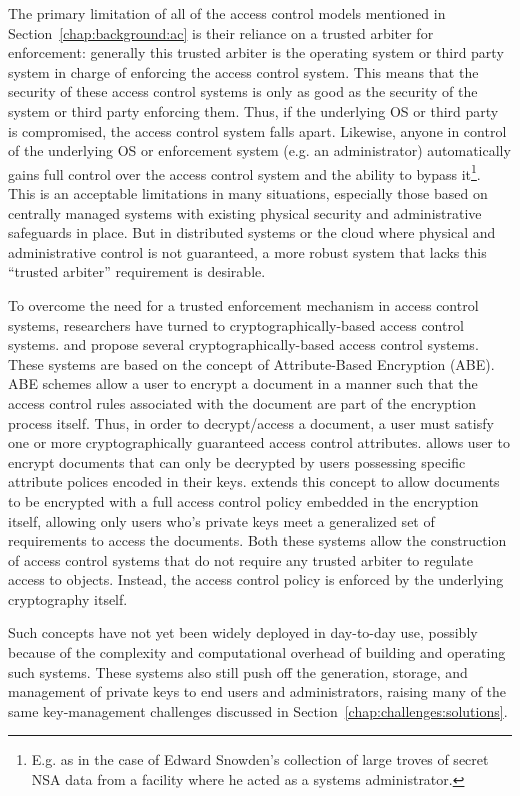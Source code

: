 The primary limitation of all of the access control models mentioned
in Section~\ref{chap:background:ac} is their reliance on a trusted
arbiter for enforcement: generally this trusted arbiter is the
operating system or third party system in charge of enforcing the
access control system. This means that the security of these access
control systems is only as good as the security of the system or third
party enforcing them. Thus, if the underlying OS or third party is
compromised, the access control system falls apart. Likewise, anyone
in control of the underlying OS or enforcement system (e.g. an
administrator) automatically gains full control over the access
control system and the ability to bypass it\footnote{E.g. as in the
  case of Edward Snowden's collection of large troves of secret NSA
  data from a facility where he acted as a systems
  administrator.}. This is an acceptable limitations in many
situations, especially those based on centrally managed systems with
existing physical security and administrative safeguards in place. But
in distributed systems or the cloud where physical and administrative
control is not guaranteed, a more robust system that lacks this
``trusted arbiter'' requirement is desirable.

To overcome the need for a trusted enforcement mechanism in access
control systems, researchers have turned to cryptographically-based
access control systems. \cite{goyal2006} and \cite{bethencourt2007}
propose several cryptographically-based access control systems. These
systems are based on the concept of Attribute-Based Encryption
(ABE). ABE schemes allow a user to encrypt a document in a manner such
that the access control rules associated with the document are part of
the encryption process itself. Thus, in order to decrypt/access a
document, a user must satisfy one or more cryptographically guaranteed
access control attributes. \cite{goyal2006} allows user to encrypt
documents that can only be decrypted by users possessing specific
attribute polices encoded in their keys. \cite{bethencourt2007}
extends this concept to allow documents to be encrypted with a full
access control policy embedded in the encryption itself, allowing only
users who's private keys meet a generalized set of requirements to
access the documents. Both these systems allow the construction of
access control systems that do not require any trusted arbiter to
regulate access to objects. Instead, the access control policy is
enforced by the underlying cryptography itself.

Such concepts have not yet been widely deployed in day-to-day use,
possibly because of the complexity and computational overhead of
building and operating such systems. These systems also still push off
the generation, storage, and management of private keys to end users
and administrators, raising many of the same key-management challenges
discussed in Section~\ref{chap:challenges:solutions}.

